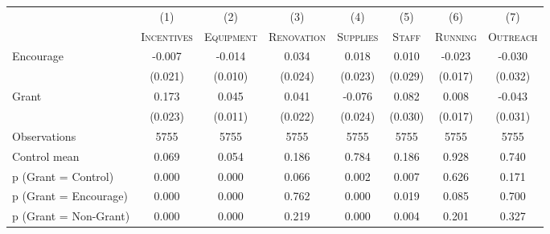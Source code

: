 \begin{tabular*}{\hsize}{@{\hskip\tabcolsep\extracolsep\fill}l*{7}{c}}
\toprule
                    &\multicolumn{1}{c}{(1)}&\multicolumn{1}{c}{(2)}&\multicolumn{1}{c}{(3)}&\multicolumn{1}{c}{(4)}&\multicolumn{1}{c}{(5)}&\multicolumn{1}{c}{(6)}&\multicolumn{1}{c}{(7)}\\
                    &\multicolumn{1}{c}{\textsc{Incentives}}&\multicolumn{1}{c}{\textsc{Equipment}}&\multicolumn{1}{c}{\textsc{Renovation}}&\multicolumn{1}{c}{\textsc{Supplies}}&\multicolumn{1}{c}{\textsc{Staff}}&\multicolumn{1}{c}{\textsc{Running}}&\multicolumn{1}{c}{\textsc{Outreach}}\\
\midrule
Encourage           &      -0.007&      -0.014&       0.034&       0.018&       0.010&      -0.023&      -0.030\\
                    &     (0.021)&     (0.010)&     (0.024)&     (0.023)&     (0.029)&     (0.017)&     (0.032)\\
\addlinespace
Grant               &       0.173&       0.045&       0.041&      -0.076&       0.082&       0.008&      -0.043\\
                    &     (0.023)&     (0.011)&     (0.022)&     (0.024)&     (0.030)&     (0.017)&     (0.031)\\
\midrule
Observations        &        5755&        5755&        5755&        5755&        5755&        5755&        5755\\
Control mean        &       0.069&       0.054&       0.186&       0.784&       0.186&       0.928&       0.740\\
p (Grant = Control) &       0.000&       0.000&       0.066&       0.002&       0.007&       0.626&       0.171\\
p (Grant = Encourage)&       0.000&       0.000&       0.762&       0.000&       0.019&       0.085&       0.700\\
p (Grant = Non-Grant)&       0.000&       0.000&       0.219&       0.000&       0.004&       0.201&       0.327\\
\bottomrule
\end{tabular*}
